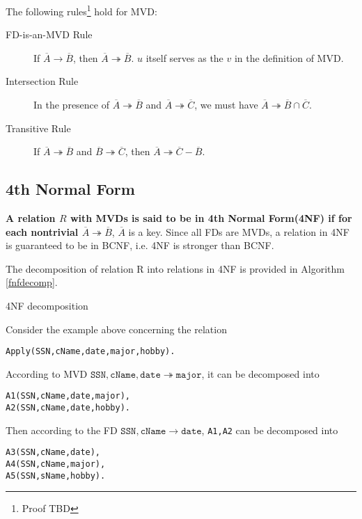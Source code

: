 The following rules\footnote{Proof TBD} hold for MVD:
\begin{description}
\item[FD-is-an-MVD Rule]If $\overline{A}\rightarrow\overline{B}$, then $\overline{A}\twoheadrightarrow\overline{B}$. $u$ itself serves as the $v$ in the definition of MVD.
\item[Intersection Rule]In the presence of $\overline{A}\twoheadrightarrow\overline{B}$ and $\overline{A}\twoheadrightarrow\overline{C}$, we must have $\overline{A}\twoheadrightarrow\overline{B}\cap\overline{C}$.
\item[Transitive Rule]If $\overline{A}\twoheadrightarrow\overline{B}$ and $\overline{B}\twoheadrightarrow\overline{C}$, then $\overline{A}\twoheadrightarrow\overline{C}-\overline{B}$.
\end{description}
\subsection{4th Normal Form}
\textbf{A relation $R$ with MVDs is said to be in 4th Normal Form(4NF) if for each nontrivial $\overline{A}\twoheadrightarrow\overline{B}$}, $\overline{A}$ is a key. Since all FDs are MVDs, a relation in 4NF is guaranteed to be in BCNF, i.e. 4NF is stronger than BCNF.

The decomposition of relation R into relations in 4NF is provided in Algorithm \eqref{fnfdecomp}. 
\begin{algorithm}[ht]
\caption{4NF decomposition}\label{fnfdecomp}
\begin{algorithmic}[1]
\Input{}
\Output{}
\Repeat
\end{algorithmic}
\end{algorithm}

Consider the example above concerning the relation
\begin{lstlisting}
Apply(SSN,cName,date,major,hobby).
\end{lstlisting}
According to MVD $\mathtt{SSN, cName, date\twoheadrightarrow major}$, it can be decomposed into
\begin{lstlisting}
A1(SSN,cName,date,major),
A2(SSN,cName,date,hobby).
\end{lstlisting}
Then according to the FD $\mathtt{SSN, cName\rightarrow date}$, \texttt{A1,A2} can be decomposed into
\begin{lstlisting}
A3(SSN,cName,date),
A4(SSN,cName,major),
A5(SSN,sName,hobby).
\end{lstlisting}
